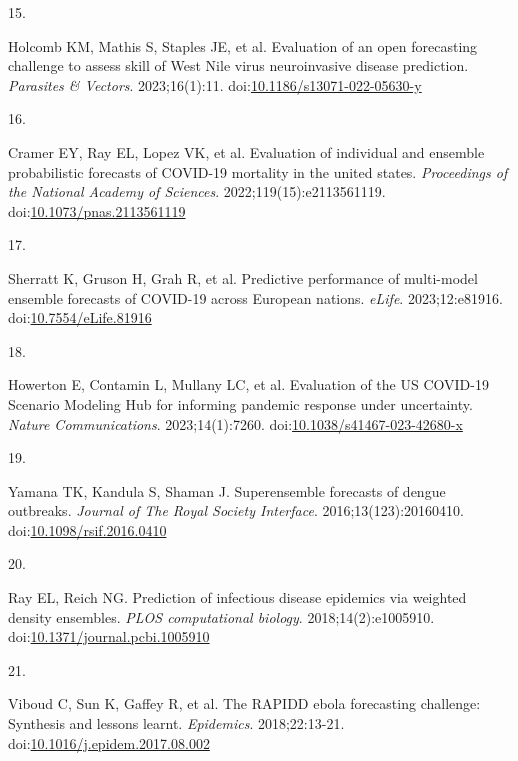 \documentclass[
  letterpaper,
  DIV=11,
  numbers=noendperiod]{scrartcl}
\newlength{\cslhangindent}
\newlength{\csllabelwidth}
\newenvironment{CSLReferences}[2] %
 {\begin{list}{}{%
  \setlength{\itemindent}{0pt}
  \setlength{\leftmargin}{0pt}
  \setlength{\parsep}{0pt}
  \ifodd #1
   \setlength{\leftmargin}{\cslhangindent}
   \setlength{\itemindent}{-1\cslhangindent}
  \fi
  \setlength{\itemsep}{#2\baselineskip}}}
 {\end{list}}
\newcommand{\CSLLeftMargin}[1]{\parbox[t]{\csllabelwidth}{\strut#1\strut}}
\newcommand{\CSLRightInline}[1]{\parbox[t]{\linewidth - \csllabelwidth}{\strut#1\strut}}
\begin{document}
\begin{CSLReferences}{0}{1}
\CSLLeftMargin{15. }%
\CSLRightInline{Holcomb KM, Mathis S, Staples JE, et al. Evaluation of
an open forecasting challenge to assess skill of {West} {Nile} virus
neuroinvasive disease prediction. \emph{Parasites \& Vectors}.
2023;16(1):11.
doi:\href{https://doi.org/10.1186/s13071-022-05630-y}{10.1186/s13071-022-05630-y}}

\CSLLeftMargin{16. }%
\CSLRightInline{Cramer EY, Ray EL, Lopez VK, et al. Evaluation of
individual and ensemble probabilistic forecasts of COVID-19 mortality in
the united states. \emph{Proceedings of the National Academy of
Sciences}. 2022;119(15):e2113561119.
doi:\href{https://doi.org/10.1073/pnas.2113561119}{10.1073/pnas.2113561119}}

\CSLLeftMargin{17. }%
\CSLRightInline{Sherratt K, Gruson H, Grah R, et al. Predictive
performance of multi-model ensemble forecasts of {COVID}-19 across
{European} nations. \emph{eLife}. 2023;12:e81916.
doi:\href{https://doi.org/10.7554/eLife.81916}{10.7554/eLife.81916}}

\CSLLeftMargin{18. }%
\CSLRightInline{Howerton E, Contamin L, Mullany LC, et al. Evaluation of
the {US} {COVID}-19 {Scenario} {Modeling} {Hub} for informing pandemic
response under uncertainty. \emph{Nature Communications}.
2023;14(1):7260.
doi:\href{https://doi.org/10.1038/s41467-023-42680-x}{10.1038/s41467-023-42680-x}}

\CSLLeftMargin{19. }%
\CSLRightInline{Yamana TK, Kandula S, Shaman J. Superensemble forecasts
of dengue outbreaks. \emph{Journal of The Royal Society Interface}.
2016;13(123):20160410.
doi:\href{https://doi.org/10.1098/rsif.2016.0410}{10.1098/rsif.2016.0410}}

\CSLLeftMargin{20. }%
\CSLRightInline{Ray EL, Reich NG. Prediction of infectious disease
epidemics via weighted density ensembles. \emph{PLOS computational
biology}. 2018;14(2):e1005910.
doi:\href{https://doi.org/10.1371/journal.pcbi.1005910}{10.1371/journal.pcbi.1005910}}

\CSLLeftMargin{21. }%
\CSLRightInline{Viboud C, Sun K, Gaffey R, et al. The RAPIDD ebola
forecasting challenge: Synthesis and lessons learnt. \emph{Epidemics}.
2018;22:13-21.
doi:\href{https://doi.org/10.1016/j.epidem.2017.08.002}{10.1016/j.epidem.2017.08.002}}


\end{CSLReferences}
\end{document}
